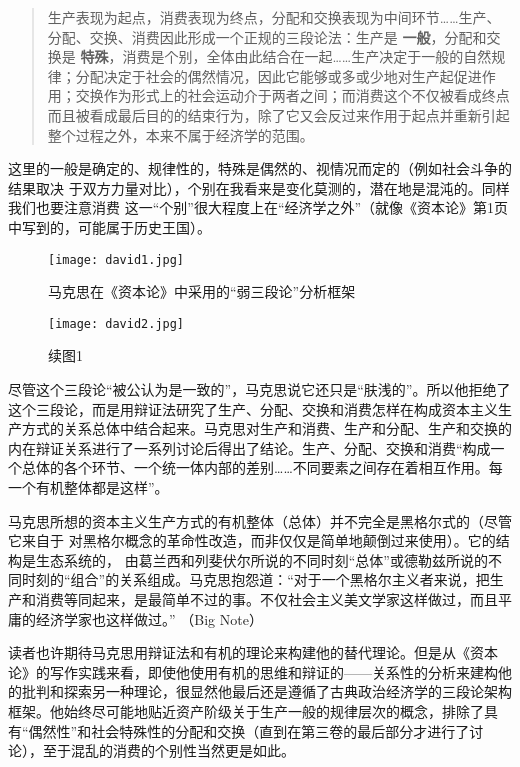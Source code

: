 \begin{quotation}
生产表现为起点，消费表现为终点，分配和交换表现为中间环节\ldots{}\ldots{}生产、分配、交换、消费因此形成一个正规的三段论法：生产是
\textbf{一般}，分配和交换是 \textbf{特殊}，消费是个别，全体由此结合在一起\ldots{}\ldots{}生产决定于一般的自然规律；分配决定于社会的偶然情况，因此它能够或多或少地对生产起促进作用；交换作为形式上的社会运动介于两者之间；而消费这个不仅被看成终点而且被看成最后目的的结束行为，除了它又会反过来作用于起点并重新引起整个过程之外，本来不属于经济学的范围。 

\end{quotation}

这里的一般是确定的、规律性的，特殊是偶然的、视情况而定的（例如社会斗争的结果取决
于双方力量对比），个别在我看来是变化莫测的，潜在地是混沌的。同样我们也要注意消费
这一“个别”很大程度上在“经济学之外”（就像《资本论》第1页中写到的，可能属于历史王国）。

\begin{figure}
\centering
\texttt{[image: david1.jpg]}
\caption{马克思在《资本论》中采用的“弱三段论”分析框架}


\texttt{[image: david2.jpg]}
\caption{续图1}
\end{figure}

尽管这个三段论“被公认为是一致的”，马克思说它还只是“肤浅的”。所以他拒绝了这个三段论，而是用辩证法研究了生产、分配、交换和消费怎样在构成资本主义生产方式的关系总体中结合起来。马克思对生产和消费、生产和分配、生产和交换的内在辩证关系进行了一系列讨论后得出了结论。生产、分配、交换和消费“构成一个总体的各个环节、一个统一体内部的差别\ldots{}\ldots{}不同要素之间存在着相互作用。每一个有机整体都是这样”。 


马克思所想的资本主义生产方式的有机整体（总体）并不完全是黑格尔式的（尽管它来自于
对黑格尔概念的革命性改造，而非仅仅是简单地颠倒过来使用）。它的结构是生态系统的，
由葛兰西和列斐伏尔所说的不同时刻“总体”或德勒兹所说的不同时刻的“组合”的关系组成。马克思抱怨道：“对于一个黑格尔主义者来说，把生产和消费等同起来，是最简单不过的事。不仅社会主义美文学家这样做过，而且平庸的经济学家也这样做过。” （Big Note）


读者也许期待马克思用辩证法和有机的理论来构建他的替代理论。但是从《资本论》的写作实践来看，即使他使用有机的思维和辩证的——关系性的分析来建构他的批判和探索另一种理论，很显然他最后还是遵循了古典政治经济学的三段论架构框架。他始终尽可能地贴近资产阶级关于生产一般的规律层次的概念，排除了具有“偶然性”和社会特殊性的分配和交换（直到在第三卷的最后部分才进行了讨论），至于混乱的消费的个别性当然更是如此。

